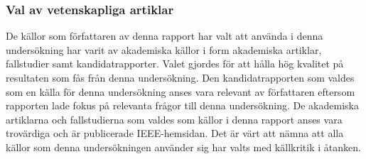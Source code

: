 \subsubsection{Val av vetenskapliga artiklar}
De källor som författaren av denna rapport har valt att använda i denna undersökning har varit av akademiska källor i form akademiska artiklar, fallstudier samt kandidatrapporter. Valet gjordes för att hålla hög kvalitet på resultaten som fås från denna undersökning. Den kandidatrapporten som valdes som en källa för denna undersökning anses vara relevant av författaren eftersom rapporten lade fokus på relevanta frågor till denna undersökning. De akademiska artiklarna och fallstudierna som valdes som källor i denna rapport anses vara trovärdiga och är publicerade IEEE-hemsidan. Det är värt att nämna att alla källor som denna undersökningen använder sig har valts med källkritik i åtanken.